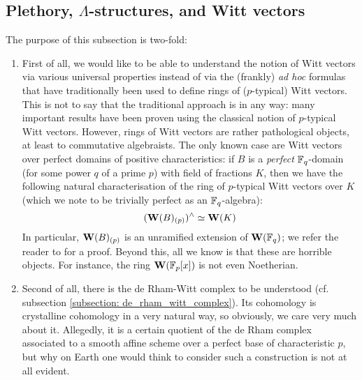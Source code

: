         \subsection{Plethory, \texorpdfstring{$\Lambda$}{}-structures, and Witt vectors}
            The purpose of this subsection is two-fold:
                \begin{enumerate}
                    \item First of all, we would like to be able to understand the notion of Witt vectors via various universal properties instead of via the (frankly) \textit{ad hoc} formulas that have traditionally been used to define rings of ($p$-typical) Witt vectors. This is not to say that the traditional approach is  in any way: many important results have been proven using the classical notion of $p$-typical Witt vectors. However, rings of Witt vectors are rather pathological objects, at least to commutative algebraists. The only known  case are Witt vectors over perfect domains of positive characteristics: if $B$ is a \textit{perfect} $\mathbb{F}_q$-domain (for some power $q$ of a prime $p$) with field of fractions $K$, then we have the following natural characterisation of the ring of $p$-typical Witt vectors over $K$ (which we note to be trivially perfect as an $\mathbb{F}_q$-algebra):
                        $$(\mathbf{W}(B)_{(p)})^{\wedge} \simeq \mathbf{W}(K)$$
                    In particular, $\mathbf{W}(B)_{(p)}$ is an unramified extension of $\mathbf{W}(\mathbb{F}_q)$; we refer the reader to \cite[Proposition 5.2]{shimomoto2014witt} for a proof. Beyond this, all we know is that these are horrible objects. For instance, the ring $\mathbf{W}(\mathbb{F}_p[x])$ is not even Noetherian. 
                    \item Second of all, there is the de Rham-Witt complex to be understood (cf. subsection \ref{subsection: de_rham_witt_complex}). Its cohomology is crystalline cohomology in a very natural way, so obviously, we care very much about it. Allegedly, it is a certain quotient of the de Rham complex associated to a smooth affine scheme over a perfect base of characteristic $p$, but why on Earth one would think to consider such a construction is not at all evident. 
                \end{enumerate}
        
